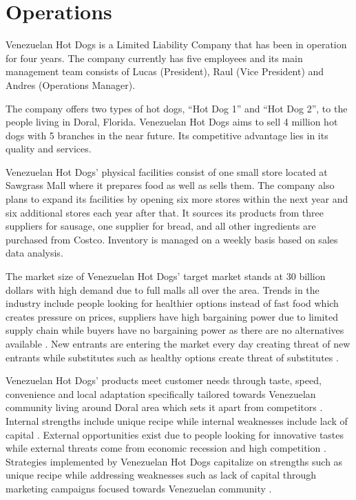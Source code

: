 

\section{Operations}\label{sec:operations} Venezuelan Hot Dogs is a Limited Liability Company that has been in operation for four years. The company currently has five employees and its main management team consists of Lucas (President), Raul (Vice President) and Andres (Operations Manager). 

The company offers two types of hot dogs, “Hot Dog 1” and “Hot Dog 2”, to the people living in Doral, Florida. Venezuelan Hot Dogs aims to sell 4 million hot dogs with 5 branches in the near future. Its competitive advantage lies in its quality and services. 

Venezuelan Hot Dogs' physical facilities consist of one small store located at Sawgrass Mall where it prepares food as well as sells them. The company also plans to expand its facilities by opening six more stores within the next year and six additional stores each year after that. It sources its products from three suppliers for sausage, one supplier for bread, and all other ingredients are purchased from Costco. Inventory is managed on a weekly basis based on sales data analysis. 

The market size of Venezuelan Hot Dogs' target market stands at 30 billion dollars with high demand due to full malls all over the area. Trends in the industry include people looking for healthier options instead of fast food which creates pressure on prices, suppliers have high bargaining power due to limited supply chain while buyers have no bargaining power as there are no alternatives available . New entrants are entering the market every day creating threat of new entrants while substitutes such as healthy options create threat of substitutes . 

Venezuelan Hot Dogs' products meet customer needs through taste, speed, convenience and local adaptation specifically tailored towards Venezuelan community living around Doral area which sets it apart from competitors . Internal strengths include unique recipe while internal weaknesses include lack of capital . External opportunities exist due to people looking for innovative tastes while external threats come from economic recession and high competition . Strategies implemented by Venezuelan Hot Dogs capitalize on strengths such as unique recipe while addressing weaknesses such as lack of capital through marketing campaigns focused towards Venezuelan community .  

